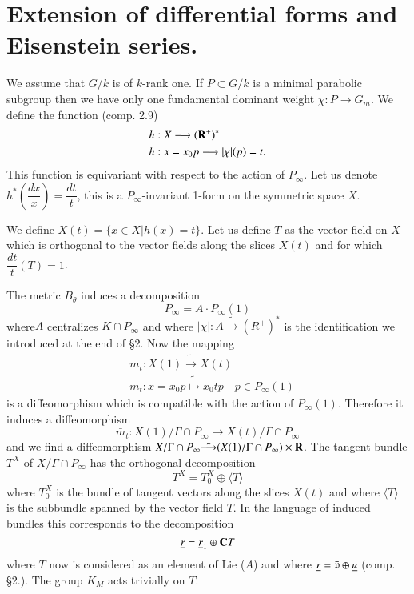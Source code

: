 \section{Extension of differential forms and Eisenstein series.}\label{art5-sec3}
We assume that $G / k$ is of $k$-rank one. If $P\subset G/k$ is a minimal parabolic subgroup then we have only one fundamental dominant weight $\chi: P\longrightarrow G_m$. We define the function (comp. 2.9)
\begin{align*}
& h : X \longrightarrow (\mathbf{R}^+)^\ast\\
& h : x = x_0 p \longrightarrow |\chi|(p) = t.
\end{align*}
This function is equivariant with respect to the action of $P_\infty$. Let us denote $h^\ast \left(\dfrac{dx}{x} \right) = \dfrac{dt}{t}$, this is a $P_\infty$-invariant 1-form on the symmetric space $X$.

We define $X (t) = \{x \in X | h(x) = t\}$. Let us define $T$ as the vector field on $X$ which is orthogonal to the vector fields along the slices $X (t)$ and for which $\dfrac{dt}{t} (T) = 1$.

The metric $B_\theta$ induces a decomposition
$$
P_\infty = A \cdot P_\infty (1)
$$
where\pageoriginale $A$ centralizes $K \cap P_\infty$ and where $|\chi| : A \tilde{\longrightarrow} (R^+)^\ast$ is the identification we introduced at the end of \S 2. Now the mapping
\begin{align*}
& m_t : X(1) \tilde{\longrightarrow} X (t)\\
&  m_t : x = x_0 p \tilde{\longmapsto} x_0 t p \quad p \in P_\infty (1)
\end{align*}
is a diffeomorphism which is compatible with the action of $P_\infty (1)$. Therefore it induces a diffeomorphism
$$
\bar{m}_t : X (1) / \Gamma \cap P_\infty \longrightarrow X (t) / \Gamma \cap P_\infty
$$
and we find a diffeomorphism $X/ \Gamma \cap P_\infty\tilde{\longrightarrow} (X(1)/ \Gamma \cap P_\infty) \times \mathbf{R}$. The tangent bundle $T^X$ of $X / \Gamma \cap P_\infty$ has the orthogonal decomposition 
$$
T^X = T^X_0 \oplus \langle T \rangle
$$
where $T^X_0$ is the bundle of tangent vectors along the slices $X(t)$ and where $\langle T \rangle$ is the subbundle spanned by the vector field $T$. In the language of induced bundles this corresponds to the decomposition
$$
\underline{r} = \underline{r}_1 \oplus \mathbf{C} T
$$
where $T$ now is considered as an element of Lie ($A$) and where $\underline{r} = \bar{\mathfrak{p}} \oplus \underline{u}$ (comp. \S 2.). The group $K_M$ acts trivially on $T$. 

